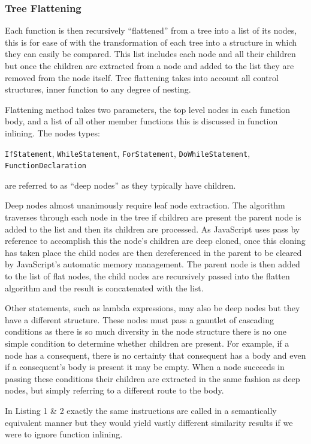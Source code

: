 \documentclass[jou,apacite]{apa6}
\begin{document}
\subsubsection{Tree Flattening}
Each function is then recursively “flattened” from a tree into a list of its nodes, this is for ease of with the transformation of each tree into a structure in which they can easily be compared. This list includes each node and all their children but once the children are extracted from a node and added to the list they are removed from the node itself. Tree flattening takes into account all control structures, inner function to any degree of nesting. 

Flattening method takes two parameters, the top level nodes in each function body, and a list of all other member functions this is discussed in function inlining. The nodes types:

\texttt{IfStatement}, \texttt{WhileStatement}, \texttt{ForStatement}, \texttt{DoWhileStatement}, \texttt{FunctionDeclaration}

 are referred to as “deep nodes” as they typically have children.

Deep nodes almost unanimously require leaf node extraction. The algorithm traverses through each node in the tree if children are present the parent node is added to the list and then its children are processed. As JavaScript uses pass by reference to accomplish this the node’s children are deep cloned, once this cloning has taken place the child nodes are then dereferenced in the parent to be cleared by JavaScript’s automatic memory management. The parent node is then added to the list of flat nodes, the child nodes are recursively passed into the flatten algorithm and the result is concatenated with the list. 

Other statements, such as lambda expressions, may also be deep nodes but they have a different structure. These nodes must pass a gauntlet of cascading conditions as there is so much diversity in the node structure there is no one simple condition to determine whether children are present. For example, if a node has a consequent, there is no certainty that consequent has a body and even if a consequent's body is present it may be empty. When a node succeeds in passing these conditions their children are extracted in the same fashion as deep nodes, but simply referring to a different route to the body. 

In Listing 1 \& 2 exactly the same instructions are called in a semantically equivalent manner but they would yield vastly different similarity results if we were to ignore function inlining. 
\end{document}
